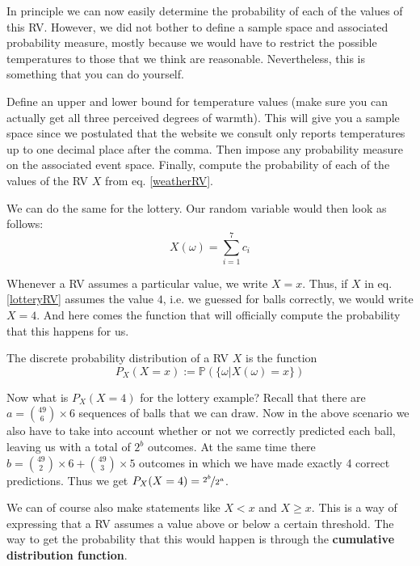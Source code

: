 \documentclass[a4paper,11pt,leqno]{report}
\begin{document}
In principle we can now easily determine the probability of each of the values of this RV. However, we did
not bother to define a sample space and associated probability measure, mostly because we would have to
restrict the possible temperatures to those that we think are reasonable. Nevertheless, this is something
that you can do yourself.

\begin{Exercise}
Define an upper and lower bound for temperature values (make sure you can actually get all three perceived
degrees of warmth). This will give you a sample space since we postulated
that the website we consult only reports temperatures up to one decimal place after the comma. Then impose
any probability measure on the associated event space. Finally, compute the probability of each of the
values of the RV $ X $ from eq. \ref{weatherRV}.
\end{Exercise}

We can do the same for the lottery. Our random variable would then look as follows:
\begin{equation}\label{lotteryRV}
X(\omega) = \overset{7}{\underset{i=1}{\sum}} c_{i}
\end{equation}

Whenever a RV assumes a particular value, we write $ X=x $. Thus, if $ X $ in eq. \ref{lotteryRV} assumes the
value $ 4 $, i.e. we guessed for balls correctly, we would write $ X=4 $. And here comes the function
that will officially compute the probability that this happens for us.

\begin{Definition}
The discrete probability distribution of a RV $ X $ is the function
$$ P_{X}(X=x) := \mathbb{P}(\{\omega|X(\omega)=x\}) $$
\end{Definition}

Now what is $ P_{X}(X=4) $ for the lottery example? Recall that there are 
$ a = \binom{49}{6} \times 6 $ sequences of balls that we can draw. Now in the above scenario we also have to take
into account whether or not we correctly predicted each ball, leaving us with a total of $ 2^{b} $
outcomes. At the same time there $ b = \binom{49}{2} \times 6 + \binom{49}{3} \times 5 $ outcomes in which we have made 
exactly 4 correct predictions. Thus we get $ P_{X}(X=4) = \nicefrac{2^{b}}{2^{a}} $.

We can of course also make statements
like $ X < x $ and $ X \geq x $. This is a way of expressing that a RV assumes a value above or below a certain
threshold. The way to get the probability that this would happen is through the \textbf{cumulative distribution
function}.
\end{document}
